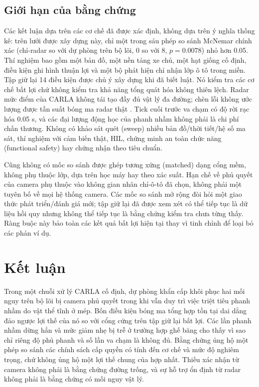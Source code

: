 \documentclass[11pt,a4paper]{article}
\begin{document}
\subsection{Giới hạn của bằng chứng}\label{sec:limits}
Các kết luận dựa trên các cơ chế đã được xác định, không dựa trên ý nghĩa
thống kê: trên lưới được xây dựng này, chỉ một trong sáu phép so sánh McNemar
chính xác (chỉ-radar so với dự phòng trên bộ lõi, 0 so với 8, $p=0.0078$) nhỏ
hơn 0.05.
Thí nghiệm bao gồm một bản đồ, một nền tảng xe chủ, một hạt giống cố định, điều
kiện ghi hình thuận lợi và một bộ phát hiện chỉ nhận lớp ô tô trong miền. Tập giữ lại 14 điều kiện được chủ ý xây
dựng khi đã biết luật. Nó kiểm tra các cơ chế bất lợi chứ không kiểm tra khả
năng tổng quát hóa không thiên lệch. Radar mức điểm của CARLA không tái tạo đầy
đủ vật lý đa đường; chèn lỗi không ước lượng được tần suất bóng ma radar thật
\cite{kraus2021ghost,magosi2022radar}. Tick cuối trước va chạm có độ rời rạc
hóa 0.05 s, và các đại lượng động học của phanh nhầm không phải là chi phí
chấn thương. Không có khảo sát quét (sweep) nhiều bản đồ/thời tiết/hệ số ma
sát, thí nghiệm với cảm biến thật, HIL, chứng minh an toàn chức năng
(functional safety) hay chứng nhận theo tiêu chuẩn.

Cũng không có mốc so sánh được ghép tương xứng (matched) dạng cổng mềm, không
phụ thuộc lớp, dựa trên học máy hay theo xác suất. Hạn chế về phủ quyết của
camera phụ thuộc vào không gian nhãn chỉ-ô-tô đã chọn, không phải một tuyên bố
về mọi hệ thống camera. Các mốc so sánh mở rộng đòi hỏi một giao thức phát
triển/đánh giá mới; tập giữ lại đã được xem xét có thể tiếp tục là dữ liệu hồi
quy nhưng không thể tiếp tục là bằng chứng kiểm tra chưa từng thấy. Ràng buộc
này bảo toàn các kết quả bất lợi hiện tại thay vì tinh chỉnh để loại bỏ các
phản ví dụ.

\section{Kết luận}
Trong một chuỗi xử lý CARLA cố định, dự phòng khẩn cấp khôi phục hai mối nguy
trên bộ lõi bị camera phủ quyết trong khi vẫn duy trì việc triệt tiêu phanh
nhầm do vật thể tĩnh ở mép. Bốn điều kiện bóng ma tổng hợp tồn tại dai dẳng
đảo ngược lợi thế của nó so với cổng cứng trên tập giữ lại bất lợi. Các lần
phanh nhầm dừng hẳn và mức giảm nhẹ bị trễ ở trường hợp ghế băng cho thấy vì
sao chỉ riêng độ phủ phanh và số lần va chạm là không đủ. Bằng chứng ủng hộ
một phép so sánh các chính sách cấp quyền có tính đến cơ chế và mức độ nghiêm
trọng, chứ không ủng hộ một lợi thế chung của hợp nhất. Thiếu xác nhận từ
camera không phải là bằng chứng đường trống, và sự hỗ trợ ổn định từ radar
không phải là bằng chứng có mối nguy vật lý.
\end{document}
